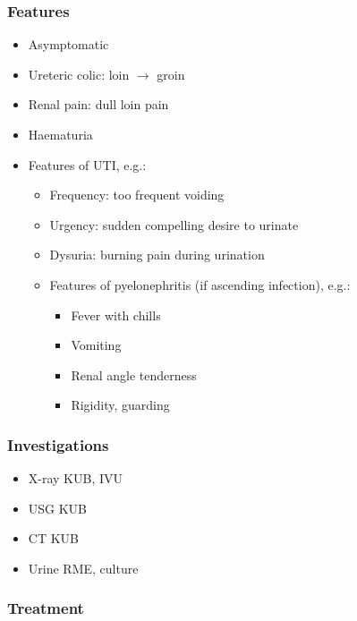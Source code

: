 \documentclass[
  14pt,
]{extarticle}
\providecommand{\tightlist}{%
  \setlength{\itemsep}{0pt}\setlength{\parskip}{0pt}}
\begin{document}
\hypertarget{features-3}{%
\subsubsection{Features}\label{features-3}}

\begin{itemize}
\tightlist
\item
  Asymptomatic
\item
  Ureteric colic: loin \(\rightarrow\) groin
\item
  Renal pain: dull loin pain
\item
  Haematuria
\item
  Features of UTI, e.g.:

  \begin{itemize}
  \tightlist
  \item
    Frequency: too frequent voiding
  \item
    Urgency: sudden compelling desire to urinate
  \item
    Dysuria: burning pain during urination
  \item
    Features of pyelonephritis (if ascending infection), e.g.:

    \begin{itemize}
    \tightlist
    \item
      Fever with chills
    \item
      Vomiting
    \item
      Renal angle tenderness
    \item
      Rigidity, guarding
    \end{itemize}
  \end{itemize}
\end{itemize}

\hypertarget{investigations-3}{%
\subsubsection{Investigations}\label{investigations-3}}

\begin{itemize}
\tightlist
\item
  X-ray KUB, IVU
\item
  USG KUB
\item
  CT KUB
\item
  Urine RME, culture
\end{itemize}

\hypertarget{treatment-4}{%
\subsubsection{Treatment}\label{treatment-4}}
\end{document}
